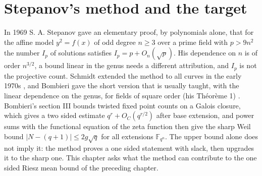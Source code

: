\label{st:ch:stepanov}

\section{Stepanov's method and the target}\label{st:sec:stepanov}
In 1969 S. A. Stepanov gave an elementary proof, by polynomials alone, that for the affine model $y^2=f(x)$ of odd degree $n\ge3$ over a prime field with $p>9n^2$ the number $I_p$ of solutions satisfies $I_p=p+O_n(\sqrt p)$. His dependence on $n$ is of order $n^{3/2}$, a bound linear in the genus needs a different attribution, and $I_p$ is not the projective count. Schmidt extended the method to all curves in the early 1970s \cite{SchmidtLNM536}, and Bombieri gave the short version that is usually taught, with the linear dependence on the genus, for fields of square order (his Th\'eor\`eme 1) \cite{BombieriStepanov}. Bombieri's section III bounds twisted fixed point counts on a Galois closure, which gives a two sided estimate $q^r+O_C(q^{r/2})$ after base extension, and power sums with the functional equation of the zeta function then give the sharp Weil bound $|N-(q+1)|\le2g\sqrt q$ for all extensions $\mathbb F_{q^n}$. The upper bound alone does not imply it: the method proves a one sided statement with slack, then upgrades it to the sharp one. This chapter asks what the method can contribute to the one sided Riesz mean bound of the preceding chapter.

